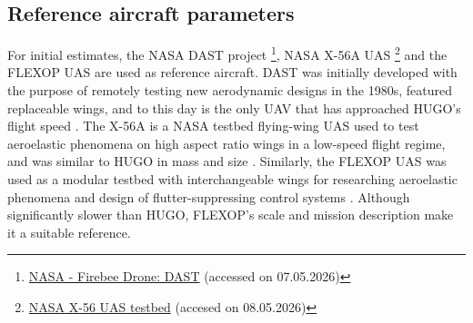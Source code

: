 
\subsection{Reference aircraft parameters}
\label{sub:lift_reference_aircraft}
For initial estimates, the NASA DAST project \footnote{\label{fn:DAST}\href{https://web.archive.org/web/20230310084826/https://www.nasa.gov/centers/dryden/multimedia/imagegallery/DAST/DAST_proj_desc.html}{NASA - Firebee Drone: DAST} (accessed on 07.05.2026)}, NASA X-56A UAS \footnote{\label{url:x56a}\href{https://www.nasa.gov/aeronautics/x-56a-mutt/}{NASA X-56 UAS testbed} (accesed on 08.05.2026)} and the FLEXOP UAS \cite{Yu2022} are used as reference aircraft. DAST was initially developed with the purpose of remotely testing new aerodynamic designs in the 1980s, featured replaceable wings, and to this day is the only UAV that has approached HUGO's flight speed . The X-56A is a NASA testbed flying-wing UAS used to test aeroelastic phenomena on high aspect ratio wings in a low-speed flight regime, and was similar to HUGO in mass and size \cite{Schaefer2023}. Similarly, the FLEXOP UAS was used as a modular testbed with interchangeable wings for researching aeroelastic phenomena and design of flutter-suppressing control systems \cite{Bauer2020}. Although significantly slower than HUGO, FLEXOP's scale and mission description make it a suitable reference.



